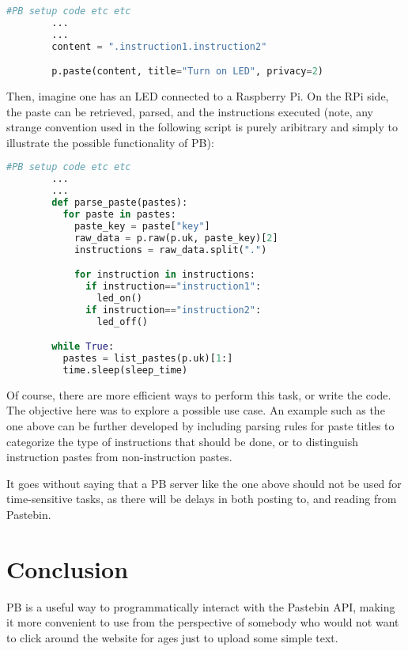 \documentclass[11pt, a4paper]{article}
\begin{document}
      \begin{lstlisting}[language=Python]
        #PB setup code etc etc
        ...
        ...
        content = ".instruction1.instruction2"

        p.paste(content, title="Turn on LED", privacy=2)
      \end{lstlisting}


      Then, imagine one has an LED connected to a Raspberry Pi. On the RPi side, the paste can be retrieved, parsed, and the instructions executed (note, any strange convention used in the following script is purely aribitrary and simply to illustrate the possible functionality of PB):


      \begin{lstlisting}[language=Python]
        #PB setup code etc etc
        ...
        ...
        def parse_paste(pastes):
          for paste in pastes:
            paste_key = paste["key"]
            raw_data = p.raw(p.uk, paste_key)[2]
            instructions = raw_data.split(".")

            for instruction in instructions:
              if instruction=="instruction1":
                led_on()
              if instruction=="instruction2":
                led_off()

        while True:
          pastes = list_pastes(p.uk)[1:]
          time.sleep(sleep_time)

      \end{lstlisting}


      Of course, there are more efficient ways to perform this task, or write the code. The objective here was to explore a possible use case. An example such as the one above can be further developed by including parsing rules for paste titles to categorize the type of instructions that should be done, or to distinguish instruction pastes from non-instruction pastes.

      It goes without saying that a PB server like the one above should not be used for time-sensitive tasks, as there will be delays in both posting to, and reading from Pastebin.

    \section{Conclusion}
      PB is a useful way to programmatically interact with the Pastebin API, making it more convenient to use from the perspective of somebody who would not want to click around the website for ages just to upload some simple text.
\end{document}

